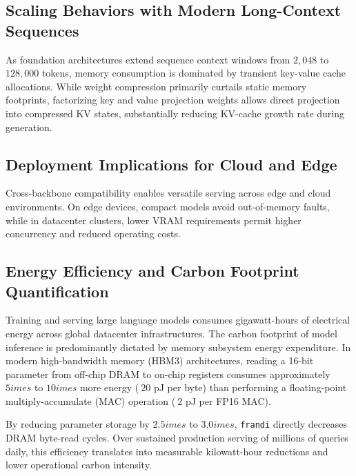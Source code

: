 \subsection{Scaling Behaviors with Modern Long-Context Sequences}
As foundation architectures extend sequence context windows from $2{,}048$ to $128{,}000$ tokens, memory consumption is dominated by transient key-value cache allocations. While weight compression primarily curtails static memory footprints, factorizing key and value projection weights allows direct projection into compressed KV states, substantially reducing KV-cache growth rate during generation.

\subsection{Deployment Implications for Cloud and Edge}
Cross-backbone compatibility enables versatile serving across edge and cloud environments. On edge devices, compact models avoid out-of-memory faults, while in datacenter clusters, lower VRAM requirements permit higher concurrency and reduced operating costs.

\subsection{Energy Efficiency and Carbon Footprint Quantification}
Training and serving large language models consumes gigawatt-hours of electrical energy across global datacenter infrastructures. The carbon footprint of model inference is predominantly dictated by memory subsystem energy expenditure. In modern high-bandwidth memory (HBM3) architectures, reading a 16-bit parameter from off-chip DRAM to on-chip registers consumes approximately $5	imes$ to $10	imes$ more energy ($~20$ pJ per byte) than performing a floating-point multiply-accumulate (MAC) operation ($~2$ pJ per FP16 MAC).

By reducing parameter storage by $2.5	imes$ to $3.0	imes$, \texttt{frandi} directly decreases DRAM byte-read cycles. Over sustained production serving of millions of queries daily, this efficiency translates into measurable kilowatt-hour reductions and lower operational carbon intensity.
